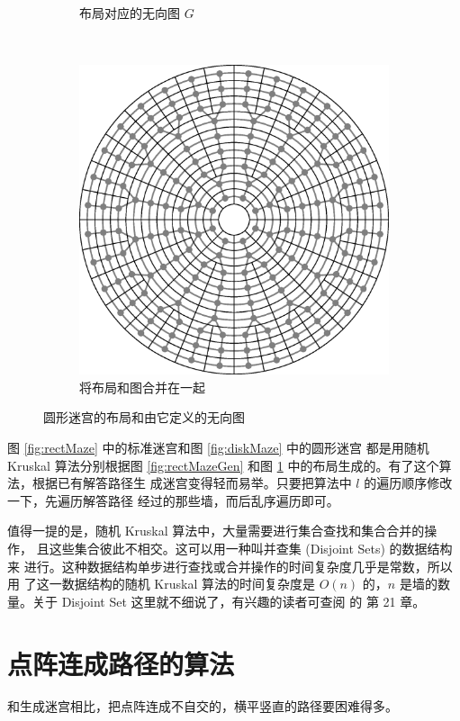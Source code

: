 \documentclass[cs4size,a4paper,adobefonts]{ctexart}
\begin{document}
\begin{figure}[htbp]
\begin{subfigure}[c]{0.31\textwidth}
    \caption{布局对应的无向图 $G$}
  \end{subfigure}
  ~
  \begin{subfigure}[c]{0.31\textwidth}
    \centering
    \includegraphics[width=\textwidth]{diskMerged}
    \caption{将布局和图合并在一起}
  \end{subfigure}
  \caption{圆形迷宫的布局和由它定义的无向图}\label{fig:diskMazeGen}
\end{figure}

图 \ref{fig:rectMaze} 中的标准迷宫和图 \ref{fig:diskMaze} 中的圆形迷宫
都是用随机 Kruskal 算法分别根据图 \ref{fig:rectMazeGen} 和图
\ref{fig:diskMazeGen} 中的布局生成的。有了这个算法，根据已有解答路径生
成迷宫变得轻而易举。只要把算法中 $l$ 的遍历顺序修改一下，先遍历解答路径
经过的那些墙，而后乱序遍历即可。

值得一提的是，随机 Kruskal 算法中，大量需要进行集合查找和集合合并的操作，
且这些集合彼此不相交。这可以用一种叫并查集 (Disjoint Sets) 的数据结构来
进行。这种数据结构单步进行查找或合并操作的时间复杂度几乎是常数，所以用
了这一数据结构的随机 Kruskal 算法的时间复杂度是 $O(n)$ 的，$n$ 是墙的数
量。关于 Disjoint Set 这里就不细说了，有兴趣的读者可查阅 \cite{clrs} 的
第 21 章。

\section{点阵连成路径的算法}
和生成迷宫相比，把点阵连成不自交的，横平竖直的路径要困难得多。



\end{document}
